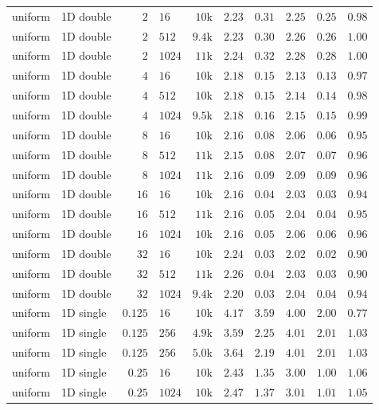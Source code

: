 {\begin{longtable}{llrlrrrrrr}
    uniform & 1D double & $2$ & $16$ & $10$k & $2.23$ & $0.31$ & $2.25$ & $0.25$ & $0.98$ \\
    uniform & 1D double & $2$ & $512$ & $9.4$k & $2.23$ & $0.30$ & $2.26$ & $0.26$ & $1.00$ \\
    uniform & 1D double & $2$ & $1024$ & $11$k & $2.24$ & $0.32$ & $2.28$ & $0.28$ & $1.00$ \\
    uniform & 1D double & $4$ & $16$ & $10$k & $2.18$ & $0.15$ & $2.13$ & $0.13$ & $0.97$ \\
    uniform & 1D double & $4$ & $512$ & $10$k & $2.18$ & $0.15$ & $2.14$ & $0.14$ & $0.98$ \\
    uniform & 1D double & $4$ & $1024$ & $9.5$k & $2.18$ & $0.16$ & $2.15$ & $0.15$ & $0.99$ \\
    uniform & 1D double & $8$ & $16$ & $10$k & $2.16$ & $0.08$ & $2.06$ & $0.06$ & $0.95$ \\
    uniform & 1D double & $8$ & $512$ & $11$k & $2.15$ & $0.08$ & $2.07$ & $0.07$ & $0.96$ \\
    uniform & 1D double & $8$ & $1024$ & $11$k & $2.16$ & $0.09$ & $2.09$ & $0.09$ & $0.96$ \\
    uniform & 1D double & $16$ & $16$ & $10$k & $2.16$ & $0.04$ & $2.03$ & $0.03$ & $0.94$ \\
    uniform & 1D double & $16$ & $512$ & $11$k & $2.16$ & $0.05$ & $2.04$ & $0.04$ & $0.95$ \\
    uniform & 1D double & $16$ & $1024$ & $10$k & $2.16$ & $0.05$ & $2.06$ & $0.06$ & $0.96$ \\
    uniform & 1D double & $32$ & $16$ & $10$k & $2.24$ & $0.03$ & $2.02$ & $0.02$ & $0.90$ \\
    uniform & 1D double & $32$ & $512$ & $11$k & $2.26$ & $0.04$ & $2.03$ & $0.03$ & $0.90$ \\
    uniform & 1D double & $32$ & $1024$ & $9.4$k & $2.20$ & $0.03$ & $2.04$ & $0.04$ & $0.94$ \\
    \midrule
    uniform & 1D single & $0.125$ & $16$ & $10$k & $4.17$ & $3.59$ & $4.00$ & $2.00$ & $0.77$ \\
    uniform & 1D single & $0.125$ & $256$ & $4.9$k & $3.59$ & $2.25$ & $4.01$ & $2.01$ & $1.03$ \\
    uniform & 1D single & $0.125$ & $256$ & $5.0$k & $3.64$ & $2.19$ & $4.01$ & $2.01$ & $1.03$ \\
    uniform & 1D single & $0.25$ & $16$ & $10$k & $2.43$ & $1.35$ & $3.00$ & $1.00$ & $1.06$ \\
    uniform & 1D single & $0.25$ & $1024$ & $10$k & $2.47$ & $1.37$ & $3.01$ & $1.01$ & $1.05$ \\

\end{longtable}}
